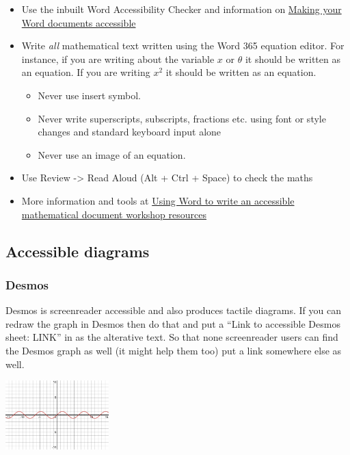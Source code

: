 \documentclass[
  10pt,
  english,
  a4paper]{article}
\providecommand{\tightlist}{%
  \setlength{\itemsep}{0pt}\setlength{\parskip}{0pt}}
\theoremstyle{plain}
\theoremstyle{plain}
\theoremstyle{plain}
\theoremstyle{plain}
\theoremstyle{plain}
\theoremstyle{definition}
\theoremstyle{definition}
\theoremstyle{definition}
\theoremstyle{remark}
\begin{document}
\begin{itemize}
\item
  Use the inbuilt Word Accessibility Checker and information on \href{https://support.office.com/en-gb/article/make-your-word-documents-accessible-to-people-with-disabilities-d9bf3683-87ac-47ea-b91a-78dcacb3c66d}{Making your Word documents accessible}
\item
  Write \emph{all} mathematical text written using the Word 365 equation editor. For instance, if you are writing about the variable \(x\) or \(\theta\) it should be written as an equation. If you are writing \(x^2\) it should be written as an equation.

  \begin{itemize}
  \tightlist
  \item
    Never use insert symbol.
  \item
    Never write superscripts, subscripts, fractions etc. using font or style changes and standard keyboard input alone
  \item
    Never use an image of an equation.
  \end{itemize}
\item
  Use Review -\textgreater{} Read Aloud (Alt + Ctrl + Space) to check the maths
\item
  More information and tools at \href{https://stem-enable.github.io/WordWorkshop/}{Using Word to write an accessible mathematical document workshop resources}
\end{itemize}

\hypertarget{accessible-diagrams}{%
\subsection{Accessible diagrams}\label{accessible-diagrams}}

\hypertarget{desmos}{%
\subsubsection{Desmos}\label{desmos}}

Desmos is screenreader accessible and also produces tactile diagrams. If you can redraw the graph in Desmos then do that and put a ``Link to accessible Desmos sheet: LINK'' in as the alterative text. So that none screenreader users can find the Desmos graph as well (it might help them too) put a link somewhere else as well.

\includegraphics[width=0.3\textwidth,height=\textheight]{./Figs/desmos-sine-graph}
\end{document}
